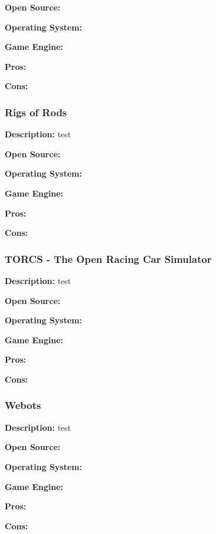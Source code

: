 \textbf{Open Source:}

\textbf{Operating System:}

\textbf{Game Engine:}

\textbf{Pros:}

\textbf{Cons:}

\subsubsection{Rigs of Rods}
\textbf{Description:} test

\textbf{Open Source:}

\textbf{Operating System:}

\textbf{Game Engine:}

\textbf{Pros:}

\textbf{Cons:}

\subsubsection{TORCS - The Open Racing Car Simulator}
\textbf{Description:} test

\textbf{Open Source:}

\textbf{Operating System:}

\textbf{Game Engine:}

\textbf{Pros:}

\textbf{Cons:}

\subsubsection{Webots}
\textbf{Description:} test

\textbf{Open Source:}

\textbf{Operating System:}

\textbf{Game Engine:}

\textbf{Pros:}

\textbf{Cons:}